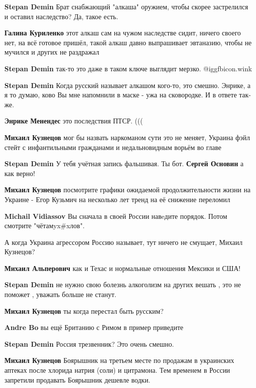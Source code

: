 \begin{itemize}
\begin{itemize}
\textbf{Stepan Demin} Брат снабжающий "алкаша" оружием, чтобы скорее застрелился и оставил наследство? Да, такое есть.

\textbf{Галина Куриленко} этот алкаш сам на чужом наследстве сидит, ничего своего нет, на всё готовое пришёл, такой алкаш давно выпрашивает эвтаназию, чтобы не мучился и других не раздражал

\textbf{Stepan Demin} так-то это даже в таком ключе выглядит мерзко.  @igg{fbicon.wink} 

\textbf{Stepan Demin} Когда русский называет алкашом кого-то, это смешно.
Энрике, а я то думаю, ково Вы мне напомнили в маске - ужа на сковородке. И в ответе так-же.

\textbf{Энрике Менендес} это последствия ПТСР. (((

\textbf{Михаил Кузнецов} мог бы назвать наркоманом сути это не меняет, Украина фэйл стейт с инфантильными гражданами и недальновидным ворьём во главе

\textbf{Stepan Demin} У тебя учётная запись фальшивая. Ты бот.
\textbf{Сергей Основин} а как верно!

\textbf{Михаил Кузнецов} посмотрите графики ожидаемой продолжительности жизни на Украине - Егор Кузьмич на несколько лет тренд на её снижение переломил

\textbf{Michail Vidiassov} Вы сначала в своей России навeдите порядок. Потом смотрите "чётамyx\#xлов".

А когда Украина агрессором Россию называет, тут ничего не смущает, Михаил Кузнецов?

\textbf{Михаил Альперович} как и Техас и нормальные отношения Мексики и США!

\textbf{Stepan Demin} не нужно свою болезнь алкоголизм на других вешать , это не поможет , уважать больше не станут.

\textbf{Михаил Кузнецов} ты когда перестал быть русским?

\textbf{Andre Bo} вы ещё Британию с Римом в пример приведите

\textbf{Stepan Demin} Россия трезвенник? Это очень смешно.

\textbf{Михаил Кузнецов} Боярышник на третьем месте по продажам в украинских аптеках после хлорида натрия (соли) и цитрамона. Тем временем в России запретили продавать Боярышник дешевле водки.


\end{itemize}
\end{itemize}
